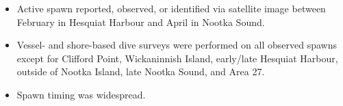 \begin{itemize}

\item Active spawn reported, observed, or identified via satellite image
between February  in Hesquiat Harbour and April  in Nootka Sound.

\item Vessel- and shore-based dive surveys were performed
on all observed spawns except for
Clifford Point, Wickaninnish Island, early/late Hesquiat Harbour,
outside of Nootka Island, late Nootka Sound, and Area 27.

\item Spawn timing was widespread.

\end{itemize}